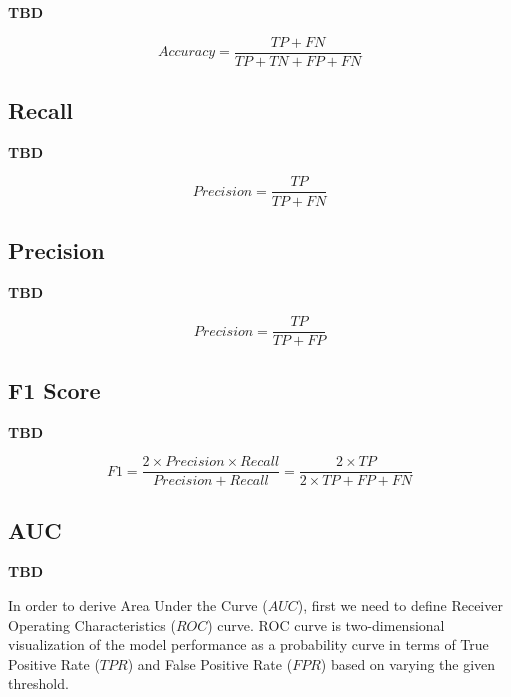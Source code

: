 \textbf{TBD}

\begin{equation}\label{eq}
    Accuracy = \frac{TP + FN}{TP + TN + FP + FN}
\end{equation}

\subsection{Recall}

\textbf{TBD}

\begin{equation}\label{eq}
    Precision = \frac{TP}{TP + FN}
\end{equation}

\subsection{Precision}

\textbf{TBD}

\begin{equation}\label{eq}
    Precision = \frac{TP}{TP + FP}
\end{equation}

\subsection{F1 Score}

\textbf{TBD}

\begin{equation}\label{eq}
    F1 = \frac{2 \times Precision \times Recall}{Precision + Recall} = \frac{2 \times TP}{2 \times TP + FP + FN}
\end{equation}

\subsection{AUC}

\textbf{TBD}

In order to derive Area Under the Curve ($AUC$), first we need to define Receiver Operating Characteristics ($ROC$) curve.
ROC curve is two-dimensional visualization of the model performance as a probability curve in terms of True Positive Rate ($TPR$) and False Positive Rate ($FPR$) based on varying the given threshold.


